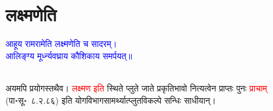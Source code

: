 \section[लक्ष्मणेति]{लक्ष्मणेति}
\centering\textcolor{blue}{आहूय रामरामेति लक्ष्मणेति च सादरम्।\nopagebreak\\
आलिङ्ग्य मूर्ध्न्यवघ्राय कौशिकाय समर्पयत्॥}\nopagebreak\\
\\
\begin{sloppypar}\justifying\noindent\hspace{10mm} अयमपि प्रयोगस्तथैव। \textcolor{red}{लक्ष्मण इति} स्थिते प्लुते जाते प्रकृति\-भावो नित्यत्वेन प्राप्तः पुनः \textcolor{red}{प्राचाम्‌} (पा॰सू॰~८.२.८६) इति योग\-विभाग\-सामर्थ्यात्प्लुत\-विकल्पे सन्धिः साधीयान्।\end{sloppypar}
